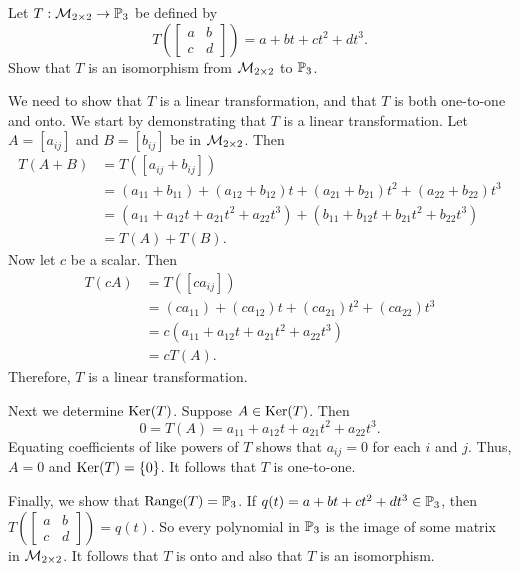 \begin{example} Let $T: \mathcal{M}_{2 \times 2} \to \mathbb{P}_3$ be defined by 
\[T\left( \left[ \begin{array}{cc} a&b\\c&d \end{array} \right] \right) = a+bt+ct^2+dt^3.\]
Show that $T$ is an isomorphism from $\mathcal{M}_{2 \times 2}$ to $\mathbb{P}_3$.

\ExampleSolution

We need to show that $T$ is a linear transformation, and that $T$ is both one-to-one and onto. We start by demonstrating that $T$ is a linear transformation. Let $A = [a_{ij}]$ and $B = [b_{ij}]$ be in $\mathcal{M}_{2 \times 2}$. Then
\begin{align*}
T(A+B) &= T\left([a_{ij}+b_{ij}]\right) \\
	&= \left(a_{11}+b_{11}\right) + \left(a_{12}+b_{12}\right)t + \left(a_{21}+b_{21}\right)t^2 + \left(a_{22}+b_{22}\right)t^3 \\
	&= \left(a_{11}+a_{12}t+a_{21}t^2+a_{22}t^3\right)  +  \left(b_{11}+b_{12}t+b_{21}t^2+b_{22}t^3\right) \\
	&= T(A) + T(B).
\end{align*}
Now let $c$ be a scalar. Then
\begin{align*}
T(cA) &= T\left([ca_{ij}]\right) \\
	&= \left(ca_{11}\right)+\left(ca_{12}\right)t+\left(ca_{21}\right)t^2+\left(ca_{22}\right)t^3 \\
	&= c\left(a_{11}+a_{12}t+a_{21}t^2+a_{22}t^3\right) \\
	&= cT(A).
\end{align*}
Therefore, $T$ is a linear transformation.

Next we determine $\text{Ker}(T)$. Suppose $A \in \text{Ker}(T)$. Then 
\[0 = T(A) = a_{11}+a_{12}t+a_{21}t^2+a_{22}t^3.\]
Equating coefficients of like powers of $T$ shows that $a_{ij} = 0$ for each $i$ and $j$. Thus, $A = 0$ and $\text{Ker}(T) = \{0\}$. It follows that $T$ is one-to-one.

Finally, we show that $\text{Range}(T) = \mathbb{P}_3$. If $q(t) = a+bt+ct^2+dt^3 \in \mathbb{P}_3$, then $T\left( \left[ \begin{array}{cc} a&b\\c&d \end{array} \right] \right) = q(t)$. So every polynomial in $\mathbb{P}_3$ is the image of some matrix in $\mathcal{M}_{2 \times 2}$. It follows that $T$ is onto and also that $T$ is an isomorphism. 
  
\end{example}



